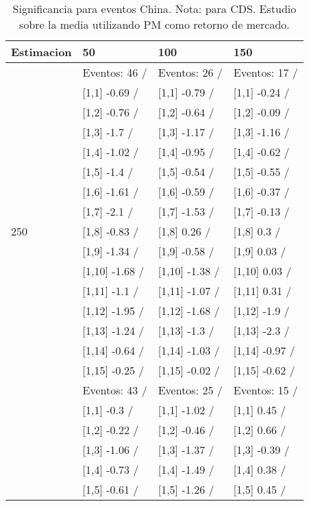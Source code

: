 \begin{table}

\caption{Significancia para eventos China. Nota: para CDS. Estudio sobre la media utilizando PM como retorno de mercado.}
\centering
\begin{tabular}[t]{llll}
\toprule
Estimacion & 50 & 100 & 150\\
\midrule
 & Eventos:  46 / & Eventos:  26 / & Eventos:  17 /\\
 & {}[1,1] -0.69  / & {}[1,1] -0.79  / & {}[1,1] -0.24  /\\
 & {}[1,2] -0.76  / & {}[1,2] -0.64  / & {}[1,2] -0.09  /\\
 & {}[1,3] -1.7  / & {}[1,3] -1.17  / & {}[1,3] -1.16  /\\
 & {}[1,4] -1.02  / & {}[1,4] -0.95  / & {}[1,4] -0.62  /\\
\addlinespace
 & {}[1,5] -1.4  / & {}[1,5] -0.54  / & {}[1,5] -0.55  /\\
 & {}[1,6] -1.61  / & {}[1,6] -0.59  / & {}[1,6] -0.37  /\\
 & {}[1,7] -2.1  / & {}[1,7] -1.53  / & {}[1,7] -0.13  /\\
250 & {}[1,8] -0.83  / & {}[1,8] 0.26  / & {}[1,8] 0.3  /\\
 & {}[1,9] -1.34  / & {}[1,9] -0.58  / & {}[1,9] 0.03  /\\
\addlinespace
 & {}[1,10] -1.68  / & {}[1,10] -1.38  / & {}[1,10] 0.03  /\\
 & {}[1,11] -1.1  / & {}[1,11] -1.07  / & {}[1,11] 0.31  /\\
 & {}[1,12] -1.95  / & {}[1,12] -1.68  / & {}[1,12] -1.9  /\\
 & {}[1,13] -1.24  / & {}[1,13] -1.3  / & {}[1,13] -2.3  /\\
 & {}[1,14] -0.64  / & {}[1,14] -1.03  / & {}[1,14] -0.97  /\\
\addlinespace
 & {}[1,15] -0.25  / & {}[1,15] -0.02  / & {}[1,15] -0.62  /\\
 & Eventos:  43 / & Eventos:  25 / & Eventos:  15 /\\
 & {}[1,1] -0.3  / & {}[1,1] -1.02  / & {}[1,1] 0.45  /\\
 & {}[1,2] -0.22  / & {}[1,2] -0.46  / & {}[1,2] 0.66  /\\
 & {}[1,3] -1.06  / & {}[1,3] -1.37  / & {}[1,3] -0.39  /\\
\addlinespace
 & {}[1,4] -0.73  / & {}[1,4] -1.49  / & {}[1,4] 0.38  /\\
 & {}[1,5] -0.61  / & {}[1,5] -1.26  / & {}[1,5] 0.45  /\\

\end{tabular}
\end{table}
